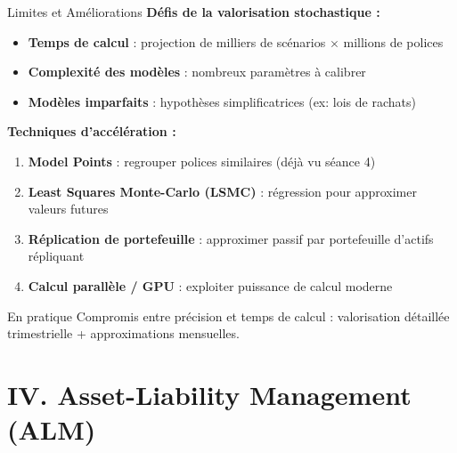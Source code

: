 \documentclass[10pt,aspectratio=169,xcolor={dvipsnames}]{beamer}
\begin{document}
\begin{frame}{Limites et Améliorations}
\textbf{Défis de la valorisation stochastique :}

\begin{itemize}
    \item[\texttimes] \textbf{Temps de calcul} : projection de milliers de scénarios $\times$ millions de polices
    \item[\texttimes] \textbf{Complexité des modèles} : nombreux paramètres à calibrer
    \item[\texttimes] \textbf{Modèles imparfaits} : hypothèses simplificatrices (ex: lois de rachats)
\end{itemize}

\vspace{0.3cm}
\textbf{Techniques d'accélération :}

\begin{enumerate}
    \item \textbf{Model Points} : regrouper polices similaires (déjà vu séance 4)
    \item \textbf{Least Squares Monte-Carlo (LSMC)} : régression pour approximer valeurs futures
    \item \textbf{Réplication de portefeuille} : approximer passif par portefeuille d'actifs répliquant
    \item \textbf{Calcul parallèle / GPU} : exploiter puissance de calcul moderne
\end{enumerate}

\vspace{0.3cm}
\begin{exampleblock}{En pratique}
Compromis entre précision et temps de calcul : valorisation détaillée trimestrielle + approximations mensuelles.
\end{exampleblock}
\end{frame}

\section{IV. Asset-Liability Management (ALM)}
\end{document}
